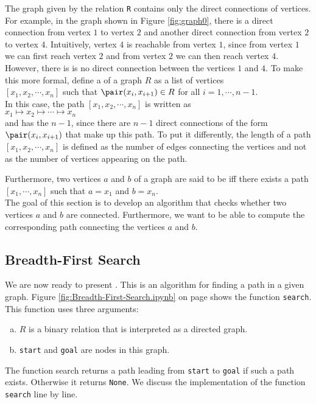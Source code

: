 \noindent
The graph given by the relation \texttt{R} contains only the direct connections of vertices.  For example, in
the graph shown in Figure \ref{fig:graph0}, there is a direct connection from vertex $1$ to vertex $2$ and
another direct connection from vertex $2$ to vertex $4$.  Intuitively, vertex $4$ is reachable from vertex $1$,
since from vertex $1$ we can first reach vertex $2$ and from vertex $2$ we can then reach vertex $4$.  However,
there is is no direct connection between the vertices $1$ and $4$.  To make this more formal, define
a  of a graph $R$ as a list of vertices
\\[0.2cm]
\hspace*{1.3cm}
$[x_1, x_2, \cdots, x_n]$ \quad such that \quad $\pair(x_i,x_{i+1}) \in R$ \quad for all $i=1,\cdots,n-1$.
\\[0.2cm]
In this case, the path $[x_1, x_2, \cdots, x_n]$ is written as
\\[0.2cm]
\hspace*{1.3cm}
$x_1 \mapsto x_2 \mapsto \cdots \mapsto x_n$
\\[0.2cm]
and has the  $n-1$, since there are $n-1$ direct connections of the form $\pair(x_i,x_{i+1})$ that
make up this path.
To put it differently,  the length of a path
$[x_1,x_2,\cdots,x_n]$ is defined as the number of edges connecting the vertices and not as the
number of vertices appearing on the path.

Furthermore,  two vertices $a$ and $b$ of a graph are said to be   iff there exists a path
\\[0.2cm]
\hspace*{1.3cm}
$[x_1,\cdots,x_n]$ \quad such that \quad $a = x_1$ \quad and \quad $b = x_n$.
\\[0.2cm]
The goal of this section is to develop an algorithm that checks whether two vertices $a$ and $b$ are connected.
Furthermore, we want to be able to compute the corresponding path connecting the vertices $a$ and $b$.

\subsection{Breadth-First Search}
We are now ready to present  .  This is an algorithm
for finding a path in a given graph.  Figure \ref{fig:Breadth-First-Search.ipynb} on page
\pageref{fig:Breadth-First-Search.ipynb} shows the function \texttt{search}.  This function uses three
arguments:
\begin{enumerate}[(a)]
\item $R$ is a binary relation that is interpreted as a directed graph.
\item \texttt{start} and \texttt{goal} are nodes in this graph.
\end{enumerate}
The function search returns a path leading from \texttt{start} to  \texttt{goal} if such a path exists.
Otherwise it returns \texttt{None}.  We discuss the implementation of the function \texttt{search} line by line.

